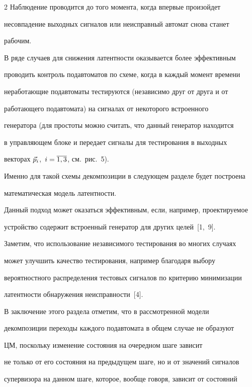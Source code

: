 \begin{multicols}{2}
Наблюдение проводится до того момента, когда впервые произойдет


несовпадение выходных сигналов или неисправный автомат снова станет


рабочим.





В ряде случаев для снижения латентности оказывается более эффективным


проводить контроль подавтоматов по схеме, когда в каждый момент времени


неработающие подавтоматы тестируются (независимо друг от друга и от


работающего под\-ав\-то\-ма\-та) на сигналах от некоторого встроенного


генератора (для простоты можно считать, что данный генератор находится


в управляющем блоке и передает сигналы для тестирования в выходных


векторах $\vec p_i$,\ $i=\overline{1,3}$, см.\ рис.~5).


Именно для такой схемы декомпозиции в следующем разделе будет построена


математическая модель латентности.





Данный подход может оказаться эффективным, если, например, проектируемое


устройство содержит встроенный генератор для других целей~[1,~9].


Заметим, что использование независимого тестирования во многих случаях


может улучшить качество тестирования, например благодаря выбору


вероятностного распределения тестовых сигналов по критерию минимизации


латентности обнаружения неисправности~[4].





В заключение этого раздела отметим, что в рассмотренной модели


декомпозиции переходы каж\-до\-го подавтомата в общем случае не образуют


ЦМ, поскольку изменение состояния на очередном шаге зависит


не только от его состояния на предыду\-щем шаге, но и от значений сигналов


супервизора на данном шаге, которое, вообще говоря, зависит от состояний



\end{multicols}
